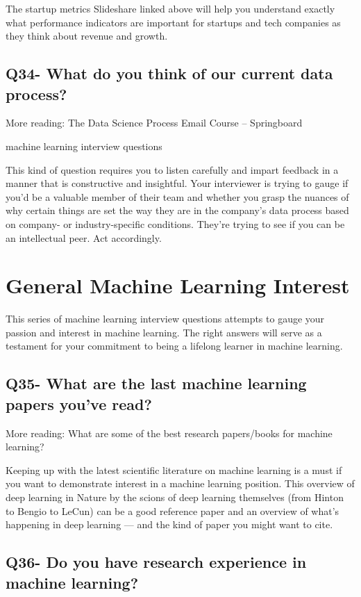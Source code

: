 \documentclass[11pt,a4paper]{article}
\begin{document}
The startup metrics Slideshare linked above will help you understand exactly what performance indicators are important for startups and tech companies as they think about revenue and growth.

\subsection{Q34- What do you think of our current data process?}

More reading: The Data Science Process Email Course – Springboard

machine learning interview questions

This kind of question requires you to listen carefully and impart feedback in a manner that is constructive and insightful. Your interviewer is trying to gauge if you’d be a valuable member of their team and whether you grasp the nuances of why certain things are set the way they are in the company’s data process based on company- or industry-specific conditions. They’re trying to see if you can be an intellectual peer. Act accordingly.

\section{General Machine Learning Interest}
This series of machine learning interview questions attempts to gauge your passion and interest in machine learning. The right answers will serve as a testament for your commitment to being a lifelong learner in machine learning.

\subsection{Q35- What are the last machine learning papers you’ve read?}

More reading: What are some of the best research papers/books for machine learning?

Keeping up with the latest scientific literature on machine learning is a must if you want to demonstrate interest in a machine learning position. This overview of deep learning in Nature by the scions of deep learning themselves (from Hinton to Bengio to LeCun) can be a good reference paper and an overview of what’s happening in deep learning — and the kind of paper you might want to cite.

\subsection{Q36- Do you have research experience in machine learning?}
\end{document}
